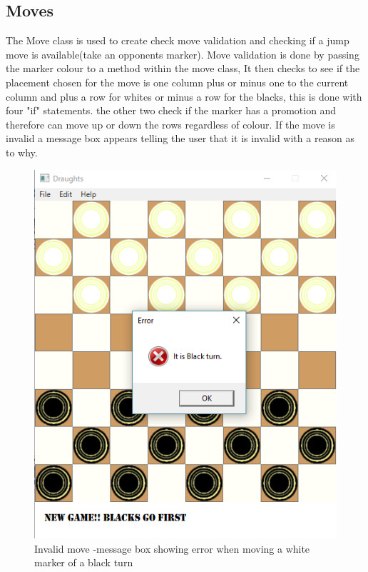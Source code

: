 \documentclass[10pt, a4paper]{article}
\begin{document}
	\subsection{Moves}
	The Move class  is used to create check move validation and checking if a jump move is available(take an opponents marker). Move validation is done by passing the marker colour to a method within the move class, It then checks to see if the placement chosen for the move is one column plus or minus one to the current column and plus a row for whites or minus a row for the blacks, this is done with four "if" statements. the other two check if the marker has a promotion and therefore can move up or down the rows regardless of colour.  If the move is invalid a message box appears telling the user that it is invalid with a reason as to why.
	\begin{figure}[H]
  	\centering
  	\includegraphics[scale = 0.5]{errors}
	\caption{Invalid move -message box showing error when moving a white marker of a black turn}
  	\label{fig:nonfloat}
	\end{figure}
	
\end{document}
